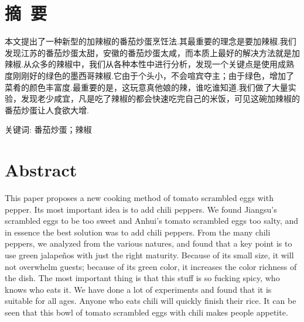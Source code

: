 %
%
% 
%




\setlength{\baselineskip}{20pt}

\title{\hei{}\mytitle}
\maketitle
\thispagestyle{empty}
\clearpage



{\pagestyle{plain}
\tableofcontents
\clearpage}


\setcounter{page}{1}
\section*{摘~要}
本文提出了一种新型的加辣椒的番茄炒蛋烹饪法.其最重要的理念是要加辣椒.我们发现江苏的番茄炒蛋太甜，安徽的番茄炒蛋太咸，而本质上最好的解决方法就是加辣椒.从众多的辣椒中，我们从各种本性中进行分析，发现一个关键点是使用成熟度刚刚好的绿色的墨西哥辣椒.它由于个头小，不会喧宾夺主；由于绿色，增加了菜肴的颜色丰富度.最重要的是，这玩意真他娘的辣，谁吃谁知道.我们做了大量实验，发现老少咸宜，凡是吃了辣椒的都会快速吃完自己的米饭，可见这碗加辣椒的番茄炒蛋让人食欲大增.

\vspace{1em}\noindent
{\hei 关键词:}
{\song 番茄炒蛋；辣椒}
\clearpage



\section*{Abstract}
This paper proposes a new cooking method of tomato scrambled eggs with pepper. Its most important idea is to add chili peppers. We found Jiangsu's scrambled eggs to be too sweet and Anhui's tomato scrambled eggs too salty, and in essence the best solution was to add chili peppers. From the many chili peppers, we analyzed from the various natures, and found that a key point is to use green jalapeños with just the right maturity. Because of its small size, it will not overwhelm guests; because of its green color, it increases the color richness of the dish. The most important thing is that this stuff is so fucking spicy, who knows who eats it. We have done a lot of experiments and found that it is suitable for all ages. Anyone who eats chili will quickly finish their rice. It can be seen that this bowl of tomato scrambled eggs with chili makes people appetite.


